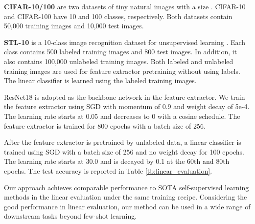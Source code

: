 \documentclass{article}
\begin{document}
\textbf{CIFAR-10/100} are two datasets of tiny natural images with a size  \citep{krizhevsky:2009}. CIFAR-10 and CIFAR-100 have 10 and 100 classes, respectively. Both datasets contain 50,000 training images and 10,000 test images.

\textbf{STL-10} is a 10-class image recognition dataset for unsupervised learning \citep{coates:etal:2011stl10}. Each class contains 500 labeled training images and 800 test images. In addition, it also contains 100,000 unlabeled training images. Both labeled and unlabeled training images are used for feature extractor pretraining without using labels. The linear classifier is learned using the labeled training images.  

ResNet18 is adopted as the backbone network in the feature extractor. We train the feature extractor using SGD with momentum of 0.9 and weight decay of 5e-4. The learning rate starts at 0.05 and decreases to 0 with a cosine schedule. The feature extractor is trained for 800 epochs with a batch size of 256. 

After the feature extractor is pretrained by unlabeled data, a linear classifier is trained using SGD with a batch size of 256 and no weight decay for 100 epochs. The learning rate starts at 30.0 and is decayed by 0.1 at the 60th and 80th epochs. The test accuracy is reported in Table \ref{tb:linear_evaluation}. 

\begin{table}[!ht]
  \renewcommand\arraystretch{1.3}
\centering
  \caption{Accuracy under linear evaluation protocol}
 \label{tb:linear_evaluation}
\end{table}

Our approach achieves comparable performance to SOTA self-supervised learning methods in the linear evaluation under the same training recipe. Considering the good performance in linear evaluation, our method can be used in a wide range of downstream tasks beyond few-shot learning.
\end{document}
